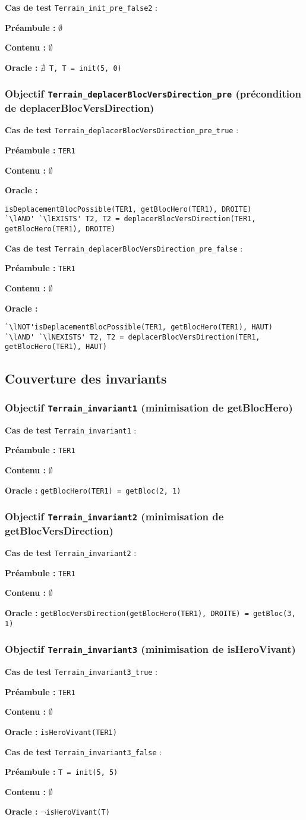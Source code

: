 \documentclass{article}
\newcommand{\cmd}[1]{\texttt{#1}}
\newcommand{\lAND}{$\land$}
\newcommand{\lNOT}{$\lnot$}
\newcommand{\lEXISTS}{$\exists$}
\newcommand{\lNEXISTS}{$\nexists{}$}
\newcommand{\obj}[2]{\subsubsection*{\large{\textbf{Objectif {\cmd{#1} (#2)}}}}}
\newenvironment{cas}[1]
{
	\hspace{1em}\textbf{Cas de test} \cmd{#1} :
	\begin{list}{}{}
}{
	\end{list}\vspace{1em}
}
\newcommand{\pre}[1]{\item \textbf{Préambule :} \cmd{#1}}
\newcommand{\npre}{\item \textbf{Préambule :} $\emptyset$}
\newcommand{\nope}{\item \textbf{Contenu :} $\emptyset$}
\newcommand{\ora}[1]{\item \textbf{Oracle :} \cmd{#1}}
\newcommand{\oram}{\item \textbf{Oracle :}}
\begin{document}
	\begin{cas} {Terrain\_init\_pre\_false2}
		\npre{}
		\nope{}
		\ora{\lNEXISTS{} T, T = init(5, 0)}
	\end{cas}

\obj{Terrain\_deplacerBlocVersDirection\_pre} {précondition de deplacerBlocVersDirection}
	\begin{cas} {Terrain\_deplacerBlocVersDirection\_pre\_true}
		\pre{TER1}
		\nope{}
		\oram{}
		\begin{lstlisting}
isDeplacementBlocPossible(TER1, getBlocHero(TER1), DROITE)
`\lAND' `\lEXISTS' T2, T2 = deplacerBlocVersDirection(TER1, getBlocHero(TER1), DROITE)
		\end{lstlisting}
	\end{cas}

	\begin{cas} {Terrain\_deplacerBlocVersDirection\_pre\_false}
		\pre{TER1}
		\nope{}
		\oram{}
		\begin{lstlisting}
`\lNOT'isDeplacementBlocPossible(TER1, getBlocHero(TER1), HAUT)
`\lAND' `\lNEXISTS' T2, T2 = deplacerBlocVersDirection(TER1, getBlocHero(TER1), HAUT)
		\end{lstlisting}
	\end{cas}

\subsection{Couverture des invariants}

\obj{Terrain\_invariant1} {minimisation de getBlocHero}
	\begin{cas} {Terrain\_invariant1}
		\pre{TER1}
		\nope{}
		\ora{getBlocHero(TER1) = getBloc(2, 1)}
	\end{cas}

\obj{Terrain\_invariant2} {minimisation de getBlocVersDirection}
	\begin{cas} {Terrain\_invariant2}
		\pre{TER1}
		\nope{}
		\ora{getBlocVersDirection(getBlocHero(TER1), DROITE) = getBloc(3, 1)}
	\end{cas}

\obj{Terrain\_invariant3} {minimisation de isHeroVivant}
	\begin{cas} {Terrain\_invariant3\_true}
		\pre{TER1}
		\nope{}
		\ora{isHeroVivant(TER1)}
	\end{cas}

	\begin{cas} {Terrain\_invariant3\_false}
		\pre{T = init(5, 5)}
		\nope{}
		\ora{\lNOT{}isHeroVivant(T)}
	\end{cas}
\end{document}
